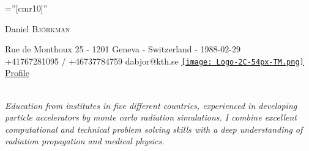 \documentclass[a4paper,10pt]{article}
\begin{document}
\pagestyle{empty} %
 
\font\fb=''[cmr10]'' %
\par{\centering
        {\Huge Daniel \textsc{Björkman}
        
    }Rue de Monthoux 25 - 1201 Geneva - Switzerland - 1988-02-29\\
    \phone \enspace +41767281095 / +46737784759 \textbullet \enspace \Envelope \enspace dabjor@kth.se \textbullet   \href{http://www.linkedin.com/in/danielbjorkman88}{\texttt{[image: Logo-2C-54px-TM.png]}} \href{http://www.linkedin.com/in/danielbjorkman88}{Profile} \\ \\
   
    \centering
 
    \bigskip\par
    }
  
 
\emph{Education from institutes in five different countries, experienced in developing particle accelerators by monte carlo radiation simulations. I combine excellent computational and technical problem solving skills with a deep understanding of radiation propagation and medical physics.}
 

 
\end{document}
